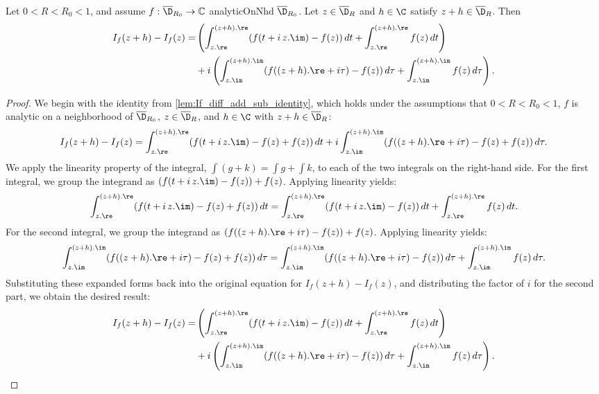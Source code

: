 \begin{lemma}\label{lem:If_diff_linearity}
\leanok
Let $0<R<R_0<1$, and assume $f:\overline{\D}_{R_0}\to\mathbb{C}$ analyticOnNhd $\overline{\D}_{R_0}$. Let $z \in \overline{\D}_R$ and $h\in\C$ satisfy $z+h \in \overline{\D}_R$. Then
\begin{align*}
I_f(z+h)-I_f(z) = &\left( \int_{z.\re}^{(z+h).\re} (f(t + i\,z.\im) - f(z))\,dt + \int_{z.\re}^{(z+h).\re} f(z)\,dt \right) \\
&+ i \left( \int_{z.\im}^{(z+h).\im} (f((z+h).\re + i\tau) - f(z))\,d\tau + \int_{z.\im}^{(z+h).\im} f(z)\,d\tau \right).
\end{align*}
\end{lemma}
\begin{proof}
\leanok
We begin with the identity from \cref{lem:If_diff_add_sub_identity}, which holds under the assumptions that $0<R<R_0<1$, $f$ is analytic on a neighborhood of $\overline{\D}_{R_0}$, $z \in \overline{\D}_R$, and $h\in\C$ with $z+h \in \overline{\D}_R$:
\[ I_f(z+h)-I_f(z) = \int_{z.\re}^{(z+h).\re} (f(t + i\,z.\im) - f(z) + f(z))\,dt + i \int_{z.\im}^{(z+h).\im} (f((z+h).\re + i\tau) - f(z) + f(z))\,d\tau. \]
We apply the linearity property of the integral, $\int(g+k) = \int g + \int k$, to each of the two integrals on the right-hand side.
For the first integral, we group the integrand as $(f(t + i\,z.\im) - f(z)) + f(z)$. Applying linearity yields:
\[ \int_{z.\re}^{(z+h).\re} (f(t + i\,z.\im) - f(z) + f(z))\,dt = \int_{z.\re}^{(z+h).\re} (f(t + i\,z.\im) - f(z))\,dt + \int_{z.\re}^{(z+h).\re} f(z)\,dt. \]
For the second integral, we group the integrand as $(f((z+h).\re + i\tau) - f(z)) + f(z)$. Applying linearity yields:
\[ \int_{z.\im}^{(z+h).\im} (f((z+h).\re + i\tau) - f(z) + f(z))\,d\tau = \int_{z.\im}^{(z+h).\im} (f((z+h).\re + i\tau) - f(z))\,d\tau + \int_{z.\im}^{(z+h).\im} f(z)\,d\tau. \]
Substituting these expanded forms back into the original equation for $I_f(z+h)-I_f(z)$, and distributing the factor of $i$ for the second part, we obtain the desired result:
\begin{align*}
I_f(z+h)-I_f(z) = &\left( \int_{z.\re}^{(z+h).\re} (f(t + i\,z.\im) - f(z))\,dt + \int_{z.\re}^{(z+h).\re} f(z)\,dt \right) \\
&+ i \left( \int_{z.\im}^{(z+h).\im} (f((z+h).\re + i\tau) - f(z))\,d\tau + \int_{z.\im}^{(z+h).\im} f(z)\,d\tau \right).
\end{align*}
\end{proof}

